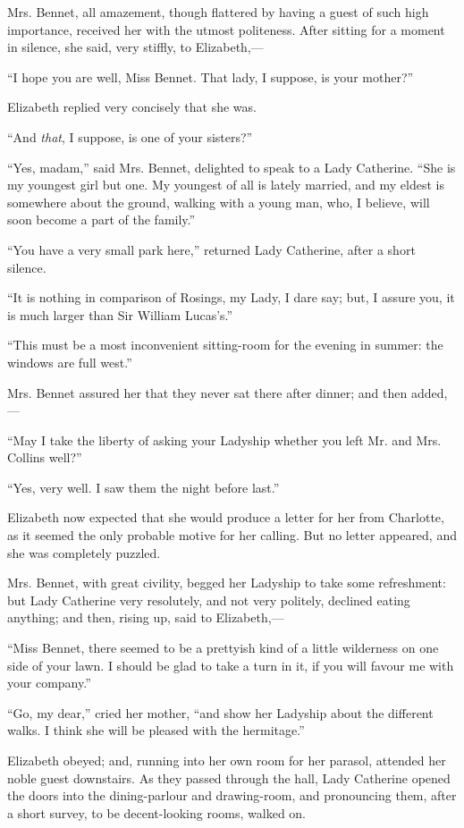 Mrs. Bennet, all amazement, though flattered by having a guest of such high importance, received her with the utmost politeness. After sitting for a moment in silence, she said, very stiffly, to Elizabeth,---

``I hope you are well, Miss Bennet. That lady, I suppose, is your mother?''

Elizabeth replied very concisely that she was.

``And \textit{that}, I suppose, is one of your sisters?''

``Yes, madam,'' said Mrs. Bennet, delighted to speak to a Lady Catherine. ``She is my youngest girl but one. My youngest of all is lately married, and my eldest is somewhere about the ground, walking with a young man, who, I believe, will soon become a part of the family.''

``You have a very small park here,'' returned Lady Catherine, after a short silence.

``It is nothing in comparison of Rosings, my Lady, I dare say; but, I assure you, it is much larger than Sir William Lucas's.''

``This must be a most inconvenient sitting-room for the evening in summer: the windows are full west.''

Mrs. Bennet assured her that they never sat there after dinner; and then added,---

``May I take the liberty of asking your Ladyship whether you left Mr. and Mrs. Collins well?''

``Yes, very well. I saw them the night before last.''

Elizabeth now expected that she would produce a letter for her from Charlotte, as it seemed the only probable motive for her calling. But no letter appeared, and she was completely puzzled.

Mrs. Bennet, with great civility, begged her Ladyship to take some refreshment: but Lady Catherine very resolutely, and not very politely, declined eating anything; and then, rising up, said to Elizabeth,---

``Miss Bennet, there seemed to be a prettyish kind of a little wilderness on one side of your lawn. I should be glad to take a turn in it, if you will favour me with your company.''

``Go, my dear,'' cried her mother, ``and show her Ladyship about the different walks. I think she will be pleased with the hermitage.''

Elizabeth obeyed; and, running into her own room for her parasol, attended her noble guest downstairs. As they passed through the hall, Lady Catherine opened the doors into the dining-parlour and drawing-room, and pronouncing them, after a short survey, to be decent-looking rooms, walked on.

